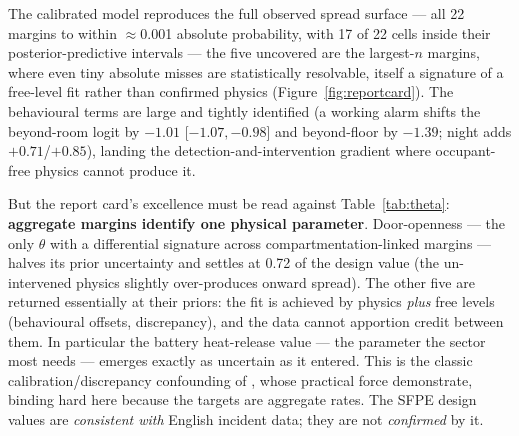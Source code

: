 \documentclass[11pt]{article}
\begin{document}
The calibrated model reproduces the full observed spread surface --- all 22
margins to within $\approx$0.001 absolute probability, with 17 of 22 cells
inside their posterior-predictive intervals --- the five uncovered are the
largest-$n$ margins, where even tiny absolute misses are statistically
resolvable, itself a signature of a free-level fit rather than confirmed
physics (Figure~\ref{fig:reportcard}). The
behavioural terms are large and tightly identified (a working alarm shifts the
beyond-room logit by $-1.01$ [$-1.07,-0.98$] and beyond-floor by $-1.39$;
night adds $+0.71$/$+0.85$), landing the detection-and-intervention gradient
where occupant-free physics cannot produce it.

But the report card's excellence must be read against Table~\ref{tab:theta}:
\textbf{aggregate margins identify one physical parameter}. Door-openness ---
the only $\theta$ with a differential signature across compartmentation-linked
margins --- halves its prior uncertainty and settles at 0.72 of the design
value (the un-intervened physics slightly over-produces onward spread). The
other five are returned essentially at their priors: the fit is achieved by
physics \emph{plus} free levels (behavioural offsets, discrepancy), and the
data cannot apportion credit between them. In particular the battery
heat-release value --- the parameter the sector most needs --- emerges exactly
as uncertain as it entered. This is the classic calibration/discrepancy
confounding of \citet{kennedy2001}, whose practical force
\citet{brynjarsdottir2014} demonstrate, binding hard here because the targets
are aggregate rates. The SFPE design values are \emph{consistent with} English
incident data; they are not \emph{confirmed} by it.
\end{document}
